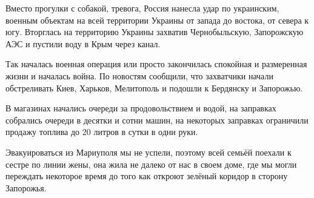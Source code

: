 Вместо прогулки с собакой,  тревога, Россия нанесла удар по украинским, военным
объектам на всей территории Украины от запада до востока, от севера к югу.
Вторглась на территорию Украины захватив Чернобыльскую, Запорожскую АЭС и
пустили воду в Крым через канал.

Так началась военная операция или просто закончилась спокойная и размеренная
жизни и началась война. По новостям сообщили, что захватчики начали
обстреливать Киев, Харьков, Мелитополь и подошли к  Бердянску и Запорожью.

В магазинах начались очереди за продовольствием и водой, на заправках собрались
очереди в  десятки и сотни машин, на некоторых заправках ограничили продажу
топлива до 20 литров в сутки в одни руки.

Эвакуироваться из Мариуполя мы не успели, поэтому всей семьёй поехали к
сестре по линии жены, она жила не далеко от нас в своем доме, где мы могли
переждать некоторое время до того как откроют зелёный коридор в сторону
Запорожья.
